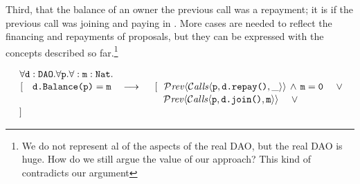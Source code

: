 \noindent
Third, that the balance of an owner  the previous call was
a repayment; it is  if  the previous call was  joining  and paying in . More cases are needed to reflect the financing and repayments of proposals, but they can be expressed with the concepts described so far.\footnote{We do not represent al of the
aspects of the real DAO, but the real DAO is huge.
How do we still argue the value of our approach? This kind of contradicts our argument}

\noindent
$\strut \hspace{0.5cm} \forall {\mbox{\tt{d}}}:{\mbox{\tt{DAO}}}.\forall {\mbox{\tt{p}}}.\forall:{\mbox{\tt{m}}}:{\mbox{\tt{Nat}}}.$\\
$\strut \hspace{0.5cm} [ \ \ \  \prg{d.Balance(p)}=\prg{m} \ \ \  \longrightarrow   
 \ \  \ \ 
  [ \  \ \Prev{\Calls{\prg{p},\prg{d.repay()},\_}}\, \wedge\, \prg{m}=\prg{0} \ \ \ \ \vee $\\
$\strut \hspace{5.7cm}      
\Prev{\Calls{\prg{p},\prg{d.join()},\prg{m}}}  \ \ \ \ \vee   $\\
 
%                         
$\strut \hspace{0.5cm} ] $
  



\vspace{.1cm}

%
%


